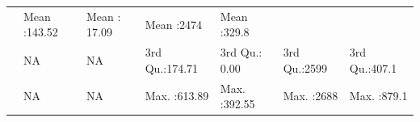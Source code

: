 \documentclass[]{article}
\begin{document}
\begin{longtable}[]{@{}lllllll@{}}
\begin{minipage}[t]{0.14\columnwidth}
\end{minipage} & \begin{minipage}[t]{0.13\columnwidth}\raggedright\strut
Mean :143.52\strut
\end{minipage} & \begin{minipage}[t]{0.13\columnwidth}\raggedright\strut
Mean : 17.09\strut
\end{minipage} & \begin{minipage}[t]{0.11\columnwidth}\raggedright\strut
Mean :2474\strut
\end{minipage} & \begin{minipage}[t]{0.12\columnwidth}\raggedright\strut
Mean :329.8\strut
\end{minipage}\tabularnewline
\begin{minipage}[t]{0.03\columnwidth}\raggedright\strut
\strut
\end{minipage} & \begin{minipage}[t]{0.14\columnwidth}\raggedright\strut
NA\strut
\end{minipage} & \begin{minipage}[t]{0.14\columnwidth}\raggedright\strut
NA\strut
\end{minipage} & \begin{minipage}[t]{0.13\columnwidth}\raggedright\strut
3rd Qu.:174.71\strut
\end{minipage} & \begin{minipage}[t]{0.13\columnwidth}\raggedright\strut
3rd Qu.: 0.00\strut
\end{minipage} & \begin{minipage}[t]{0.11\columnwidth}\raggedright\strut
3rd Qu.:2599\strut
\end{minipage} & \begin{minipage}[t]{0.12\columnwidth}\raggedright\strut
3rd Qu.:407.1\strut
\end{minipage}\tabularnewline
\begin{minipage}[t]{0.03\columnwidth}\raggedright\strut
\strut
\end{minipage} & \begin{minipage}[t]{0.14\columnwidth}\raggedright\strut
NA\strut
\end{minipage} & \begin{minipage}[t]{0.14\columnwidth}\raggedright\strut
NA\strut
\end{minipage} & \begin{minipage}[t]{0.13\columnwidth}\raggedright\strut
Max. :613.89\strut
\end{minipage} & \begin{minipage}[t]{0.13\columnwidth}\raggedright\strut
Max. :392.55\strut
\end{minipage} & \begin{minipage}[t]{0.11\columnwidth}\raggedright\strut
Max. :2688\strut
\end{minipage} & \begin{minipage}[t]{0.12\columnwidth}\raggedright\strut
Max. :879.1\strut
\end{minipage}\tabularnewline
\bottomrule
\end{longtable}
\end{document}
